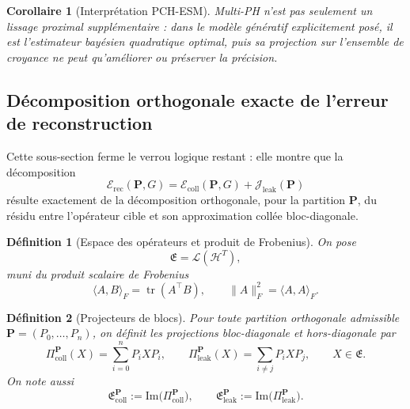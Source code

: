 \documentclass[11pt,a4paper]{article}
\newtheorem{definition}{Définition}[section]
\newtheorem{corollary}{Corollaire}[section]
\DeclareMathOperator{\tr}{tr}
\newcommand{\Hh}{\mathcal H}
\newcommand{\1}{\mathbf 1}
\begin{document}
\begin{corollary}[Interprétation PCH-ESM]
Multi-PH n'est pas seulement un lissage proximal supplémentaire :
dans le modèle génératif explicitement posé, il est l'estimateur bayésien quadratique optimal, puis sa projection sur l'ensemble de croyance ne peut qu'améliorer ou préserver la précision.
\end{corollary}




\subsection{Décomposition orthogonale exacte de l'erreur de reconstruction}

Cette sous-section ferme le verrou logique restant : elle montre que la décomposition
\[
\mathcal E_{\mathrm{rec}}(\mathbf P,G)
=
\mathcal E_{\mathrm{coll}}(\mathbf P,G)
+
\mathcal J_{\mathrm{leak}}(\mathbf P)
\]
résulte exactement de la décomposition orthogonale, pour la partition \(\mathbf P\), du résidu
entre l'opérateur cible et son approximation collée bloc-diagonale.

\begin{definition}[Espace des opérateurs et produit de Frobenius]
On pose
\[
\mathfrak E=\mathcal L(\Hh^T),
\]
muni du produit scalaire de Frobenius
\[
\langle A,B\rangle_F=\tr(A^\top B),
\qquad
\|A\|_F^2=\langle A,A\rangle_F.
\]
\end{definition}

\begin{definition}[Projecteurs de blocs]
Pour toute partition orthogonale admissible \(\mathbf P=(P_0,\dots,P_n)\), on définit les projections
bloc-diagonale et hors-diagonale par
\[
\Pi_{\mathrm{coll}}^{\mathbf P}(X)
=
\sum_{i=0}^n P_iXP_i,
\qquad
\Pi_{\mathrm{leak}}^{\mathbf P}(X)
=
\sum_{i\neq j}P_iXP_j,
\qquad
X\in\mathfrak E.
\]
On note aussi
\[
\mathfrak E_{\mathrm{coll}}^{\mathbf P}:=\mathrm{Im}\bigl(\Pi_{\mathrm{coll}}^{\mathbf P}\bigr),
\qquad
\mathfrak E_{\mathrm{leak}}^{\mathbf P}:=\mathrm{Im}\bigl(\Pi_{\mathrm{leak}}^{\mathbf P}\bigr).
\]
\end{definition}
\end{document}
